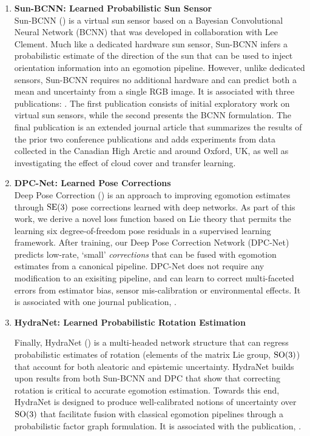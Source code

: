 \begin{enumerate}
\item \textbf{Sun-BCNN: Learned Probabilistic Sun Sensor} \\ 
Sun-BCNN () is a virtual sun sensor based on a Bayesian Convolutional Neural Network (BCNN) that was developed in collaboration with Lee Clement. Much like a dedicated hardware sun sensor, Sun-BCNN infers a probabilistic estimate of the direction of the sun that can be used to inject orientation information into an egomotion pipeline. However, unlike dedicated sensors, Sun-BCNN requires no additional hardware and can predict both a mean and uncertainty from a single RGB image. It is associated with three publications: \cite{2017_Clement_Improving,2017_Peretroukhin_Reducing,2018_Peretroukhin_Inferring}. The first publication consists of initial exploratory work on virtual sun sensors, while the second presents the BCNN formulation. The final publication is an extended journal article that summarizes the results of the prior two conference publications and adds experiments from data collected in the Canadian High Arctic and around Oxford, UK, as well as investigating the effect of cloud cover and transfer learning. 


\item \textbf{DPC-Net: Learned Pose Corrections} \\
Deep Pose Correction () is an approach to improving egomotion estimates through $\mathrm{SE}(3)$ pose corrections learned with deep networks. As part of this work, we derive a novel loss function based on Lie theory that permits the learning six degree-of-freedom pose residuals in a supervised learning framework. After training, our Deep Pose Correction Network (DPC-Net) predicts low-rate, `small' \textit{corrections} that can be fused with egomotion estimates from a canonical pipeline. DPC-Net does not require any modification to an exisiting pipeline, and can learn to correct multi-faceted errors from estimator bias, sensor mis-calibration or environmental effects. It is associated with one journal publication, \cite{2018_Peretroukhin_Deep}.

\item \textbf{HydraNet: Learned Probabilistic Rotation Estimation}

Finally, HydraNet () is a multi-headed network structure that can regress probabilistic estimates of rotation (elements of the matrix Lie group, $\mathrm{SO}(3)$) that account for both aleatoric and epistemic uncertainty. HydraNet builds upon results from both Sun-BCNN and DPC that show that correcting rotation is critical to accurate egomotion estimation.  Towards this end, HydraNet is designed to produce well-calibrated notions of uncertainty over $\mathrm{SO}(3)$  that facilitate fusion with classical egomotion pipelines through a probabilistic factor graph formulation. It is associated with the publication, \cite{2019_Peretroukhin_Deep}.

\end{enumerate}

